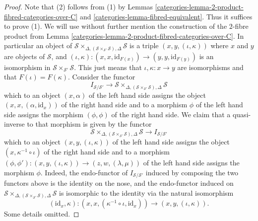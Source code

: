 \begin{proof}

Note that (2) follows from (1) by
Lemmas \ref{categories-lemma-2-product-fibred-categories-over-C} and
\ref{categories-lemma-fibred-equivalent}. Thus it suffices to prove (1).
We will use without further mention the construction of the $2$-fibre product
from
Lemma \ref{categories-lemma-2-product-fibred-categories-over-C}.
In particular an object of
$\mathcal{S}
\times_{\Delta, (\mathcal{S} \times_{\mathcal{S}'} \mathcal{S}), \Delta}
\mathcal{S}$
is a triple $(x, y, (\iota, \kappa))$ where $x$ and $y$ are objects of
$\mathcal{S}$, and
$(\iota, \kappa) : (x, x, \text{id}_{F(x)}) \to (y, y, \text{id}_{F(y)})$
is an isomorphism in $\mathcal{S} \times_{\mathcal{S}'} \mathcal{S}$.
This just means that $\iota, \kappa : x \to y$ are isomorphisms and that
$F(\iota) = F(\kappa)$. Consider the functor
$$
I_{\mathcal{S}/\mathcal{S}'}
\longrightarrow
\mathcal{S}
\times_{\Delta, (\mathcal{S} \times_{\mathcal{S}'} \mathcal{S}), \Delta}
\mathcal{S}
$$
which to an object $(x, \alpha)$ of the left hand side assigns the object
$(x, x, (\alpha, \text{id}_x))$ of the right hand side
and to a morphism $\phi$ of the left hand side
assigns the morphism $(\phi, \phi)$ of the right hand side.
We claim that a quasi-inverse to that morphism is given by the
functor
$$
\mathcal{S}
\times_{\Delta, (\mathcal{S} \times_{\mathcal{S}'} \mathcal{S}), \Delta}
\mathcal{S}
\longrightarrow
I_{\mathcal{S}/\mathcal{S}'}
$$
which to an object $(x, y, (\iota, \kappa))$ of the left hand side
assigns the object $(x, \kappa^{-1} \circ \iota)$ of the right hand side
and to a morphism
$(\phi, \phi') : (x, y, (\iota, \kappa)) \to (z, w, (\lambda, \mu))$
of the left hand side assigns the morphism $\phi$.
Indeed, the endo-functor of $I_{\mathcal{S}/\mathcal{S}'}$ induced
by composing the two functors above is the identity on the nose, and
the endo-functor induced on
$\mathcal{S}
\times_{\Delta, (\mathcal{S} \times_{\mathcal{S}'} \mathcal{S}), \Delta}
\mathcal{S}$
is isomorphic to
the identity via the natural isomorphism
$$
(\text{id}_x, \kappa) :
(x, x, (\kappa^{-1} \circ \iota, \text{id}_x))
\longrightarrow
(x, y, (\iota, \kappa)).
$$
Some details omitted.
\end{proof}

